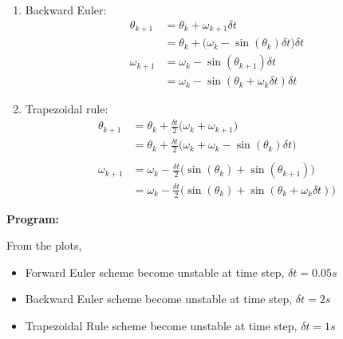 \documentclass[a4paper,11pt]{report}
\begin{document}
\begin{enumerate}
\begin{enumerate}
    \vspace{1 cm}

    \item Backward Euler:
    \begin{equation*}
    \begin{aligned}
    \theta_{k+1} &= \theta_{k} + \omega_{k+1} \delta t \\
                 &= \theta_{k} + \Big( \omega_{k} - \sin(\theta_{k}) \delta t 
    \Big) \delta t \\
    \omega_{k+1} &= \omega_{k} - \sin(\theta_{k+1}) \delta t \\
                 &= \omega_{k} - \sin(\theta_{k} + \omega_{k} \delta t) 
    \delta t
    \end{aligned}
    \end{equation*}

    \vspace{1 cm}

    \item Trapezoidal rule:
    \begin{equation*}
    \begin{aligned}
    \theta_{k+1} &= \theta_{k} + \frac{\delta t}{2} \Big( \omega_{k} + 
    \omega_{k+1} \Big) \\
                 &= \theta_{k} + \frac{\delta t}{2} \Big( \omega_{k} + 
    \omega_{k} - \sin(\theta_{k}) \delta t \Big) \\ \\
    \omega_{k+1} &= \omega_{k} - \frac{\delta t}{2} \Big( \sin(\theta_{k}) + 
    \sin(\theta_{k+1}) \Big) \\
                 &= \omega_{k} - \frac{\delta t}{2} \Big( \sin(\theta_{k}) + 
    \sin(\theta_{k} + \omega_{k} \delta t) \Big)
    \end{aligned}
    \end{equation*}

    \end{enumerate}

    \vspace{0.5 cm}

    \textbf{Program:}
    

    \vspace{1 cm}

    From the plots, 
    \begin{itemize}
    \item Forward Euler scheme become unstable at time step, $\delta t = 0.05s$
    \item Backward Euler scheme become unstable at time step, $\delta t = 2s$
    \item Trapezoidal Rule scheme become unstable at time step, $\delta t = 1s$
    \end{itemize}


\end{enumerate}
\end{document}
